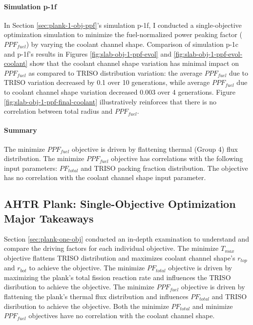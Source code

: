 \paragraph{Simulation p-1f}
In Section \ref{sec:plank-1-obj-ppf}'s simulation p-1f, I conducted a single-objective 
optimization simulation to minimize the fuel-normalized power peaking factor ($PPF_{fuel}$) 
by varying the coolant channel shape.
Comparison of simulation p-1c and p-1f's results in Figures 
\ref{fig:slab-obj-1-ppf-evol} and \ref{fig:slab-obj-1-ppf-evol-coolant} 
show that the coolant channel shape variation has minimal impact on $PPF_{fuel}$ as 
compared to \gls{TRISO} distribution variation: the average $PPF_{fuel}$ due 
to \gls{TRISO} variation decreased by 0.1 over 10 generations, while average 
$PPF_{fuel}$ due to coolant channel shape variation decreased 0.003 over 
4 generations. 
Figure \ref{fig:slab-obj-1-ppf-final-coolant} illustratively reinforces that there is 
no correlation between total radius and $PPF_{fuel}$. 

\paragraph{Summary}
The minimize $PPF_{fuel}$ objective is driven by flattening thermal (Group 4) flux 
distribution. 
The minimize $PPF_{fuel}$ objective has correlations with the following input parameters: 
$PF_{total}$ and TRISO packing fraction distribution. 
The objective has no correlation with the coolant channel shape input parameter.

\subsection{AHTR Plank: Single-Objective Optimization Major Takeaways}
Section \ref{sec:plank-one-obj} conducted an in-depth examination to understand 
and compare the driving factors for each individual objective. 
The minimize $T_{max}$ objective flattens TRISO distribution and maximizes coolant 
channel shape's $r_{top}$ and $r_{bot}$ to achieve the objective. 
The minimize $PF_{total}$ objective is driven by maximizing the plank's total fission 
reaction rate and influences the TRISO disribution to achieve the objective. 
The minimize $PPF_{fuel}$ objective is driven by flattening the plank's thermal flux
distribution and influences $PF_{total}$ and TRISO disribution to achieve the objective. 
Both the minimize $PF_{total}$ and minimize $PPF_{fuel}$ objectives have no correlation 
with the coolant channel shape. 

